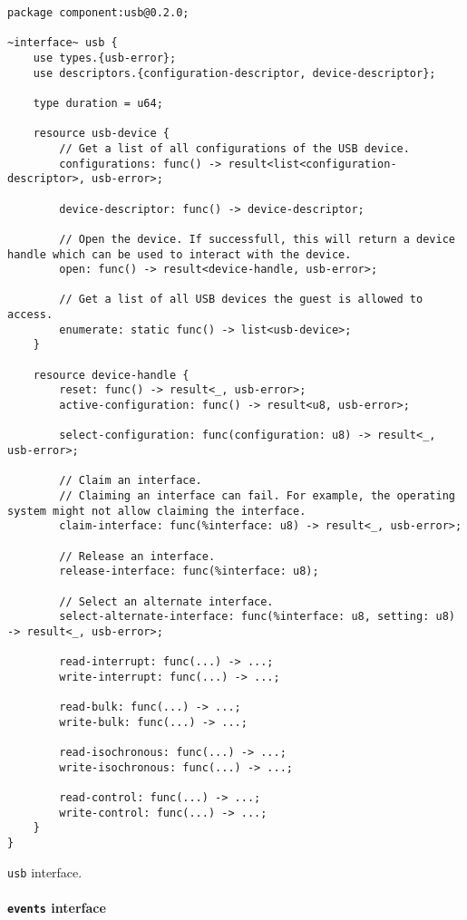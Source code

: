 \begin{code}
\begin{lstlisting}[breaklines, language=wit, tabsize=2]
package component:usb@0.2.0;

~interface~ usb {
	use types.{usb-error};
	use descriptors.{configuration-descriptor, device-descriptor};

	type duration = u64;

	resource usb-device {
		// Get a list of all configurations of the USB device.
		configurations: func() -> result<list<configuration-descriptor>, usb-error>;

		device-descriptor: func() -> device-descriptor;

		// Open the device. If successfull, this will return a device handle which can be used to interact with the device.
		open: func() -> result<device-handle, usb-error>;

		// Get a list of all USB devices the guest is allowed to access.
		enumerate: static func() -> list<usb-device>;
	}

	resource device-handle {
		reset: func() -> result<_, usb-error>;
		active-configuration: func() -> result<u8, usb-error>;

		select-configuration: func(configuration: u8) -> result<_, usb-error>;

		// Claim an interface.
		// Claiming an interface can fail. For example, the operating system might not allow claiming the interface.
		claim-interface: func(%interface: u8) -> result<_, usb-error>;

		// Release an interface.
		release-interface: func(%interface: u8);

		// Select an alternate interface.
		select-alternate-interface: func(%interface: u8, setting: u8) -> result<_, usb-error>;

		read-interrupt: func(...) -> ...;
		write-interrupt: func(...) -> ...;

		read-bulk: func(...) -> ...;
		write-bulk: func(...) -> ...;

		read-isochronous: func(...) -> ...;
		write-isochronous: func(...) -> ...;

		read-control: func(...) -> ...;
		write-control: func(...) -> ...;
	}
}
\end{lstlisting}
\caption{\texttt{usb} interface.}
\label{code:usb_interface}
\end{code}

\paragraph{\texttt{events} interface}

